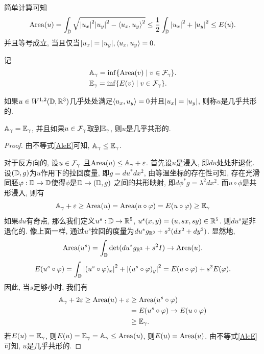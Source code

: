 简单计算可知
\begin{equation}\label{AleE}
    \text{Area}(u)=\int_{\mathbb{D}} \sqrt{{\left | u_x \right |}^2{\left | u_y \right |}^2-{\left < u_x, u_y \right >}^2} \le \frac{1}{2}\int_{\mathbb{D}} {\left | u_x \right |}^2+{\left | u_y \right |}^2 \le{E}(u).
\end{equation}
并且等号成立, 当且仅当${\left | u_x \right |}={\left | u_y \right |}, {\left < u_x, u_y \right >}=0$.
\par 记
\begin{align}
    &{\mathbb{A}_\gamma}=\inf\{\text{Area}(v)\mid v \in {\mathcal{F}_\gamma}\}.\\
    &{\mathbb{E}_\gamma}=\inf \{{E}(v)\mid v \in {\mathcal{F}_\gamma}\}.
\end{align}
\begin{definition}
    如果$u \in W^{1,2}(\mathbb{D},{\mathbb{R}}^3)$几乎处处满足${\left < u_x, u_y \right >}=0$并且${\left | u_x \right |} = {\left | u_y \right |}$, 则称$u$是几乎共形的.
\end{definition}
\begin{lemma}\label{ageg}
    ${\mathbb{A}_\gamma}={\mathbb{E}_\gamma}$, 并且如果$u \in {\mathcal{F}_\gamma}$取到${\mathbb{E}_\gamma}$, 则$u$是几乎共形的.
\end{lemma}
\begin{proof}
    由不等式\eqref{AleE}可知, ${\mathbb{A}_\gamma} \le {\mathbb{E}_\gamma}$.
    \par 对于反方向的, 设$u\in {\mathcal{F}_\gamma}$ 且$\text{Area}(u) \le {\mathbb{A}_\gamma} + \varepsilon$. 首先设$u$是浸入, 即$du$处处非退化. 设$({\mathbb{D}},g)$为$u$作用下的拉回度量, 即$g=du^*dx^2$, 由等温坐标的存在性可知, 存在光滑同胚${\varphi}: {\mathbb{D}} \to {\mathbb{D}}$使得$\phi$是$\mathbb{D} \to ({\mathbb{D}},g)$ 之间的共形映射, 即$d\phi ^* g=\lambda^2dx^2$. 而$u\circ \phi$是共形浸入, 则有
    \begin{equation}
        {\mathbb{A}_\gamma}+\varepsilon\ge \text{Area}(u)=\text{Area}(u\circ {\varphi})={E}(u\circ {\varphi}) \ge {\mathbb{E}_\gamma}
    \end{equation}
    如果$du$有奇点, 那么我们定义$u^s: {\mathbb{D}} \to {\mathbb{R}}^5$, $u^s(x,y)=(u,sx,sy)\in {\mathbb{R}}^5$. 则$du^s$是非退化的. 像上面一样, 通过$u^s$拉回的度量为$du^*g_{{\mathbb{R}}^3}+s^2(dx^2+dy^2)$. 显然地, 
    \begin{equation}
        \text{Area}(u^s)=\int_{\mathbb{D}} \det (du^*g_{{\mathbb{R}}^3}+s^2I)  \to \text{Area}(u).
    \end{equation}
    \begin{equation}
        {E}(u^s\circ{\varphi})=\int_{\mathbb{D}} {\left | (u^s\circ {\varphi})_x \right |}^2+ {\left | (u^s\circ {\varphi})_y \right |}^2 ={E}(u\circ {\varphi})+s^2{E}({\varphi}).
    \end{equation}
    因此, 当$s$足够小时, 我们有
    \begin{equation}
        \begin{split}
            {\mathbb{A}_\gamma}+2\varepsilon \ge \text{Area}(u)+\varepsilon & \ge \text{Area}(u^s\circ {\varphi})  \\
            &= {E}(u^s\circ {\varphi})  \to {E}(u\circ {\varphi}) \\
            &\ge {\mathbb{E}_\gamma}.
        \end{split}
    \end{equation}
    若$E(u)={\mathbb{E}_\gamma}$, 则$E(u)= {\mathbb{E}_\gamma} = {\mathbb{A}_\gamma} \le \text{Area}(u)$, 则$E(u)=\text{Area}(u)$. 由不等式\eqref{AleE}可知, $u$是几乎共形的.
\end{proof}
